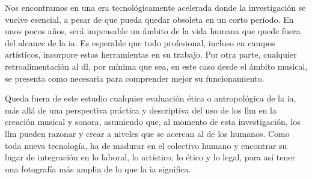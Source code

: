 Nos encontramos en una era tecnológicamente acelerada donde la investigación se vuelve esencial, a pesar de que pueda quedar obsoleta en un corto período. En unos pocos años, será impensable un ámbito de la vida humana que quede fuera del alcance de la \gls{ia}. Es esperable que todo profesional, incluso en campos artísticos, incorpore estas herramientas en su trabajo. Por otra parte, cualquier retroalimentación al \gls{dl}, por mínima que sea, en este caso desde el ámbito musical, se presenta como necesaria para comprender mejor su funcionamiento.

Queda fuera de este estudio cualquier evaluación ética o antropológica de la \gls{ia}, más allá de una perspectiva práctica y descriptiva del uso de los \gls{llm} en la creación musical y sonora, asumiendo que, al momento de esta investigación, los \gls{llm} pueden razonar y crear a niveles que se acercan al de los humanos. Como toda nueva tecnología, ha de madurar en el colectivo humano y encontrar su lugar de integración en lo laboral, lo artístico, lo ético y lo legal, para así tener una fotografía más amplia de lo que la \gls{ia} significa.




